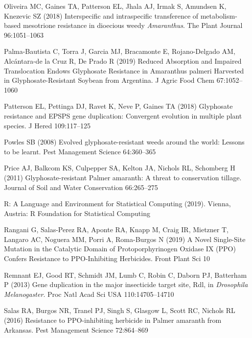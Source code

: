 \documentclass[
  12pt,
  a4paper]{article}
\begin{document}
\leavevmode\hypertarget{ref-oliveira_interspecific_2018}{}%
Oliveira MC, Gaines TA, Patterson EL, Jhala AJ, Irmak S, Amundsen K,
Knezevic SZ (2018) Interspecific and intraspecific transference of
metabolism-based mesotrione resistance in dioecious weedy
\emph{Amaranthus}. The Plant Journal 96:1051--1063

\leavevmode\hypertarget{ref-palma-bautista_reduced_2019}{}%
Palma-Bautista C, Torra J, Garcia MJ, Bracamonte E, Rojano-Delgado AM,
Alcántara-de la Cruz R, De Prado R (2019) Reduced Absorption and
Impaired Translocation Endows Glyphosate Resistance in Amaranthus
palmeri Harvested in Glyphosate-Resistant Soybean from Argentina. J
Agric Food Chem 67:1052--1060

\leavevmode\hypertarget{ref-patterson_glyphosate_2018}{}%
Patterson EL, Pettinga DJ, Ravet K, Neve P, Gaines TA (2018) Glyphosate
resistance and EPSPS gene duplication: Convergent evolution in multiple
plant species. J Hered 109:117--125

\leavevmode\hypertarget{ref-powles_evolved_2008}{}%
Powles SB (2008) Evolved glyphosate-resistant weeds around the world:
Lessons to be learnt. Pest Management Science 64:360--365

\leavevmode\hypertarget{ref-price_glyphosate-resistant_2011}{}%
Price AJ, Balkcom KS, Culpepper SA, Kelton JA, Nichols RL, Schomberg H
(2011) Glyphosate-resistant Palmer amaranth: A threat to conservation
tillage. Journal of Soil and Water Conservation 66:265--275

\leavevmode\hypertarget{ref-r_core_team_r:_2019}{}%
R: A Language and Environment for Statistical Computing (2019). Vienna,
Austria: R Foundation for Statistical Computing

\leavevmode\hypertarget{ref-rangani_novel_2019}{}%
Rangani G, Salas-Perez RA, Aponte RA, Knapp M, Craig IR, Mietzner T,
Langaro AC, Noguera MM, Porri A, Roma-Burgos N (2019) A Novel
Single-Site Mutation in the Catalytic Domain of Protoporphyrinogen
Oxidase IX (PPO) Confers Resistance to PPO-Inhibiting Herbicides. Front
Plant Sci 10

\leavevmode\hypertarget{ref-remnant_gene_2013}{}%
Remnant EJ, Good RT, Schmidt JM, Lumb C, Robin C, Daborn PJ, Batterham P
(2013) Gene duplication in the major insecticide target site, Rdl, in
\emph{Drosophila} \emph{Melanogaster}. Proc Natl Acad Sci USA
110:14705--14710

\leavevmode\hypertarget{ref-salas_resistance_2016}{}%
Salas RA, Burgos NR, Tranel PJ, Singh S, Glasgow L, Scott RC, Nichols RL
(2016) Resistance to PPO-inhibiting herbicide in Palmer amaranth from
Arkansas. Pest Management Science 72:864--869
\end{document}

